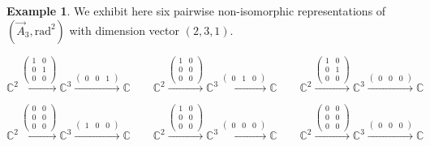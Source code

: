 \documentclass{amsart}
\theoremstyle{definition}
\newtheorem{example}[theorem]{Example}
\begin{document}
 \begin{example}
We exhibit here six pairwise non-isomorphic representations of $(\overrightarrow{A}_3,\mathrm{rad}^2)$ with dimension vector $(2,3,1)$. 

\[
 \mathbb{C}^{2} \xrightarrow{\begin{pmatrix} 1 & 0 \\ 0 & 1 \\ 0 & 0 \end{pmatrix}}  \mathbb{C}^{3} \xrightarrow{\begin{pmatrix} 0 & 0 & 1 \end{pmatrix}} \mathbb{C}  \qquad \mathbb{C}^{2} \xrightarrow{\begin{pmatrix} 1 & 0 \\ 0 & 0 \\ 0 & 0 \end{pmatrix}}  \mathbb{C}^{3} \xrightarrow{\begin{pmatrix} 0 & 1 & 0 \end{pmatrix}} \mathbb{C}  \qquad  \mathbb{C}^{2} \xrightarrow{\begin{pmatrix} 1 & 0 \\ 0 & 1 \\ 0 & 0 \end{pmatrix}}  \mathbb{C}^{3} \xrightarrow{\begin{pmatrix} 0 & 0 & 0 \end{pmatrix}} \mathbb{C} 
\]

\[
 \mathbb{C}^{2} \xrightarrow{\begin{pmatrix} 0 & 0 \\ 0 & 0 \\ 0 & 0 \end{pmatrix}}  \mathbb{C}^{3} \xrightarrow{\begin{pmatrix} 1 & 0 & 0 \end{pmatrix}} \mathbb{C}  \qquad \mathbb{C}^{2} \xrightarrow{\begin{pmatrix} 1 & 0 \\ 0 & 0 \\ 0 & 0 \end{pmatrix}}  \mathbb{C}^{3} \xrightarrow{\begin{pmatrix} 0 & 0 & 0 \end{pmatrix}} \mathbb{C}  \qquad  \mathbb{C}^{2} \xrightarrow{\begin{pmatrix} 0 & 0 \\ 0 & 0 \\ 0 & 0 \end{pmatrix}}  \mathbb{C}^{3} \xrightarrow{\begin{pmatrix} 0 & 0 & 0 \end{pmatrix}} \mathbb{C} 
\]

\end{example}
\end{document}
